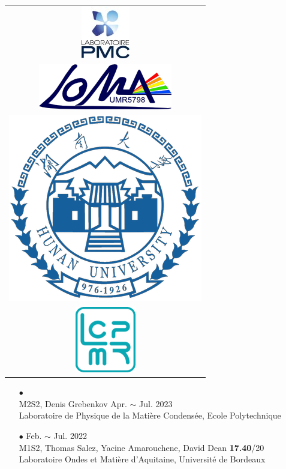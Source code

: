 \begin{frame}
	\frametitle{}

	\begin{minipage}{0.1\linewidth}
	
	\begin{center} \begin{tabular}{c}
	\includegraphics[height=1 cm]{logos/logopmc.jpg} \\[2ex]
	\includegraphics[width =1.4 cm]{logos/LOMA-CNRS-logo.png} \\[2ex]
	\includegraphics[height=1 cm]{logos/Hunan_University_logo.png} \\[2ex]
	\includegraphics[height=1 cm]{logos/LCPMR-CNRS-logo.png}
	\end{tabular} \end{center}
	
	\end{minipage}
	\begin{minipage}{0.02\linewidth}
	\end{minipage}
	\begin{minipage}{0.88\linewidth}
	
	\begin{itemize}
		\setlength{\itemsep}{3pt}

	\item[$\bullet$]  \\
	M2S2, Denis Grebenkov \hfill Apr. $\sim$ Jul. 2023 \\
	\small{Laboratoire de Physique de la Matière Condensée, Ecole Polytechnique}

	\normalsize
	\item[$\bullet$]  \hfill Feb. $\sim$ Jul. 2022 \\
	M1S2, Thomas Salez, Yacine Amarouchene, David Dean \hfill \textbf{17.40}/20 \\
	\small{Laboratoire Ondes et Matière d’Aquitaine, Université de Bordeaux}
	

\end{itemize}
\end{minipage}
\end{frame}
